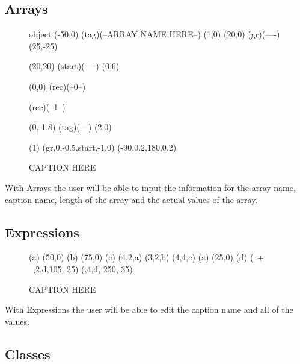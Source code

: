 \documentclass[10pt,a4paper,english]{article}
\begin{document}
\newpage
\thispagestyle{fancy}

\subsection*{Arrays}

\begin {figure}[!htbp]

\Draw

 {object}
\Move(-50,0)
\Node(tag)(--ARRAY NAME HERE--)
\MoveToExit(1,0)
\Move(20,0)
\ORectNode(gr)(----)
\Move (25,-25)

\MinNodeSize(20,20)
\Node(start)(----)
\Do(0,6)
{  
	\IF 
    	\EqInt(0,0) 				
        	\THEN
 				\RectNode(rec)(--0--)
            
   \ELSE
   		\RectNode(rec)(--1--)
   		
 		   \FI
   { 	\MoveToExit(0,-1.8)
 	\Node(tag)(--\DoReg--)
   }
   \MoveToExit(2,0)
}
\ArrowHeads(1)
\CurvedEdgeAt(gr,0,-0.5,start,-1,0) (-90,0.2,180,0.2)
\EndDraw
\caption {CAPTION HERE}
\label {fig:array}
\end {figure}

With Arrays the user will be able to input the information for the array name, caption name, length of the array and the actual values of the array.  

\subsection*{Expressions}

\begin {figure}[!htbp]
\Draw


\MarkLoc(a)
\Move(50,0)
\MarkLoc(b)
\Move(75,0)
\MarkLoc(c)
\boxItDefault(4,2,a)
\boxItDefault(3,2,b)
\boxItDefault(4,4,c)
\MoveToLoc(a)
\Move(25,0)
\MarkLoc(d)
\boxIt(~$  +  $~,2,d,105, 25)
\boxIt(\hspace{135pt}\hfill*\hspace{10pt},4,d, 250, 35)
\EndDraw
\caption {CAPTION HERE }
\label {fig:exprsBoxedAmb1}
\end {figure}

With Expressions the user will be able to edit the caption name and all of the values.

\subsection*{Classes}
\end{document}
